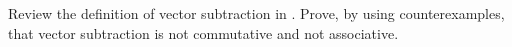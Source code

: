 Review the definition of vector subtraction in .  Prove, by using counterexamples, that vector subtraction is  not commutative and not associative.